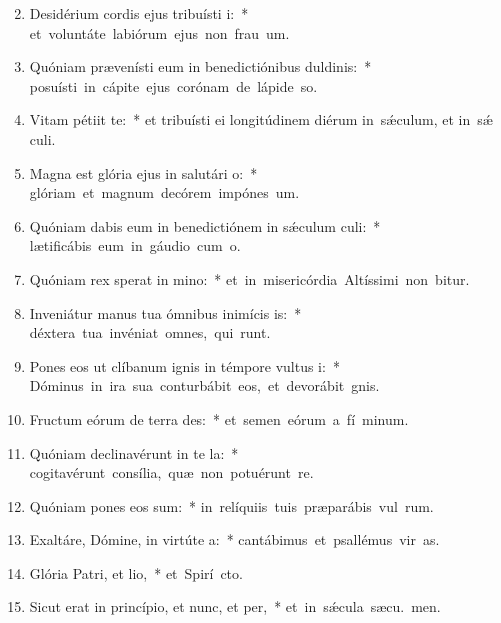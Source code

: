 \begin{flushleft}
\begin{enumerate}[leftmargin=*]
\setcounter{enumi}{1}

\item Desidérium cordis ejus tribuísti i:~* \mbox{et voluntáte labiórum ejus non frau um.}
\item Quóniam prævenísti eum in benedictiónibus duldinis:~* \mbox{posuísti in cápite ejus corónam de lápide so.}
\item Vitam pétiit  te:~* et tribuísti ei longitúdinem diérum in~s\'{\ae}culum, et in~s\'{\ae} culi.
\item Magna est glória ejus in salutári o:~* \mbox{glóriam et magnum decórem impónes  um.}
\item Quóniam dabis eum in benedictiónem in s\'{\ae}culum culi:~* \mbox{lætificábis eum in gáudio cum  o.}
\item Quóniam rex sperat in mino:~* \mbox{et in misericórdia Altíssimi non bitur.}
\item Inveniátur manus tua ómnibus inimícis is:~* \mbox{déxtera tua invéniat omnes, qui  runt.}
\item Pones eos ut clíbanum ignis in témpore vultus i:~* \mbox{Dóminus in ira sua conturbábit eos, et devorábit  gnis.}
\item Fructum eórum de terra des:~* \mbox{et semen eórum a fí minum.}
\item Quóniam declinavérunt in te la:~* \mbox{cogitavérunt consília, quæ non potuérunt re.}
\item Quóniam pones eos sum:~* \mbox{in relíquiis tuis præparábis vul rum.}
\item Exaltáre, Dómine, in virtúte a:~* \mbox{cantábimus et psallémus vir as.}
\item Glória Patri, et lio,~* \mbox{et Spirí cto.}
\item Sicut erat in princípio, et nunc, et per,~* \mbox{et in s\'{\ae}cula sæcu. men.}

\end{enumerate}
\end{flushleft}


